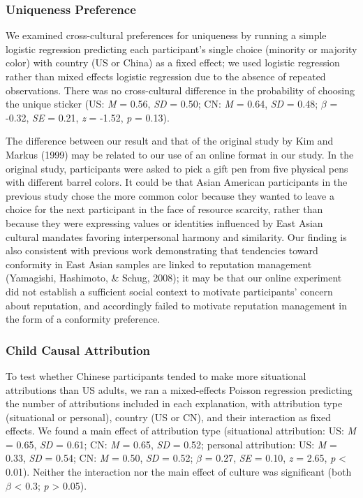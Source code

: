 \documentclass[
  man,floatsintext]{apa6}
\begin{document}
\hypertarget{uniqueness-preference-1}{%
\subsubsection{Uniqueness Preference}\label{uniqueness-preference-1}}

We examined cross-cultural preferences for uniqueness by running a simple logistic regression predicting each participant's single choice (minority or majority color) with country (US or China) as a fixed effect; we used logistic regression rather than mixed effects logistic regression due to the absence of repeated observations. There was no cross-cultural difference in the probability of choosing the unique sticker (US: \emph{M} = 0.56, \emph{SD} = 0.50; CN: \emph{M} = 0.64, \emph{SD} = 0.48; \(\beta\) = -0.32, \emph{SE} = 0.21, \emph{z} = -1.52, \emph{p} = 0.13).

The difference between our result and that of the original study by Kim and Markus (1999) may be related to our use of an online format in our study. In the original study, participants were asked to pick a gift pen from five physical pens with different barrel colors. It could be that Asian American participants in the previous study chose the more common color because they wanted to leave a choice for the next participant in the face of resource scarcity, rather than because they were expressing values or identities influenced by East Asian cultural mandates favoring interpersonal harmony and similarity. Our finding is also consistent with previous work demonstrating that tendencies toward conformity in East Asian samples are linked to reputation management (Yamagishi, Hashimoto, \& Schug, 2008); it may be that our online experiment did not establish a sufficient social context to motivate participants' concern about reputation, and accordingly failed to motivate reputation management in the form of a conformity preference.

\hypertarget{child-causal-attribution-1}{%
\subsubsection{Child Causal Attribution}\label{child-causal-attribution-1}}

To test whether Chinese participants tended to make more situational attributions than US adults, we ran a mixed-effects Poisson regression predicting the number of attributions included in each explanation, with attribution type (situational or personal), country (US or CN), and their interaction as fixed effects. We found a main effect of attribution type (situational attribution: US: \emph{M} = 0.65, \emph{SD} = 0.61; CN: \emph{M} = 0.65, \emph{SD} = 0.52; personal attribution: US: \emph{M} = 0.33, \emph{SD} = 0.54; CN: \emph{M} = 0.50, \emph{SD} = 0.52; \(\beta\) = 0.27, \emph{SE} = 0.10, \emph{z} = 2.65, \emph{p} \textless{} 0.01). Neither the interaction nor the main effect of culture was significant (both \(\beta\) \textless{} 0.3; \emph{p} \textgreater{} 0.05).
\end{document}
